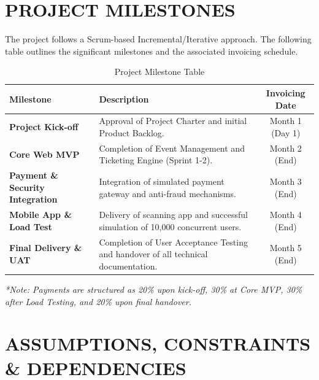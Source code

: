 \chapter{PROJECT MILESTONES}

The project follows a Scrum-based Incremental/Iterative approach. The following table outlines the significant milestones and the associated invoicing schedule.
\begin{table}[H]
\centering
\begin{tabularx}{\textwidth}{|p{4cm}|Y|c|}
\hline
\textbf{Milestone} & \textbf{Description} & \textbf{Invoicing Date} \\ \hline
\textbf{Project Kick-off} & Approval of Project Charter and initial Product Backlog. & Month 1 (Day 1) \\ \hline
\textbf{Core Web MVP} & Completion of Event Management and Ticketing Engine (Sprint 1-2). & Month 2 (End) \\ \hline
\textbf{Payment \& Security Integration} & Integration of simulated payment gateway and anti-fraud mechanisms. & Month 3 (End) \\ \hline
\textbf{Mobile App \& Load Test} & Delivery of scanning app and successful simulation of 10,000 concurrent users. & Month 4 (End) \\ \hline
\textbf{Final Delivery \& UAT} & Completion of User Acceptance Testing and handover of all technical documentation. & Month 5 (End) \\ \hline
\end{tabularx}
\caption{Project Milestone Table}
\end{table}

\vspace{1cm}
\textit{*Note: Payments are structured as 20\% upon kick-off, 30\% at Core MVP, 30\% after Load Testing, and 20\% upon final handover.}

\chapter{ASSUMPTIONS, CONSTRAINTS \& DEPENDENCIES}

